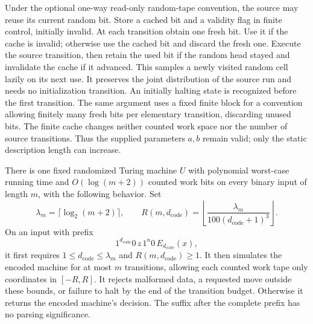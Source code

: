 Under the optional one-way read-only random-tape convention, the source
may reuse its current random bit. Store a cached bit and a validity flag
in finite control, initially invalid.
At each transition obtain one fresh bit.  Use it if the cache is invalid;
otherwise use the cached bit and discard the fresh one.  Execute the
source transition, then retain the used bit if the random head stayed
and invalidate the cache if it advanced.  This samples a newly visited
random cell lazily on its next use.  It preserves the joint distribution
of the source run and needs no initialization transition.  An initially
halting state is recognized before the first transition.  The same
argument uses a fixed finite block for a convention allowing finitely
many fresh bits per elementary transition, discarding unused bits.
The finite cache changes neither counted work space nor the number of
source transitions.  Thus the supplied parameters $a,b$ remain valid;
only the static description length can increase.

\begin{lemma}
\label{lem:compiler-interpreter}
There is one fixed randomized Turing machine $U$ with polynomial
worst-case running time and $O(\log(m+2))$ counted work bits on every
binary input of length $m$, with the following behavior.
Set
\begin{equation}\label{eq:compiler-interpreter-cap}
 \lambda_m=\lceil\log_2(m+2)\rceil,
 \qquad
 R(m,d_{\mathrm{code}})
   =\left\lfloor\frac{\lambda_m}
       {100(d_{\mathrm{code}}+1)^3}\right\rfloor.
\end{equation}
On an input with prefix
\begin{equation}\label{eq:compiler-prefix}
  1^{d_{\mathrm{code}}}0\,z\,1^n0\,
  E_{d_{\mathrm{code}}}(x),
\end{equation}
it first requires $1\le d_{\mathrm{code}}\le\lambda_m$ and
$R(m,d_{\mathrm{code}})\ge1$.  It then simulates the encoded machine
for at most $m$ transitions, allowing each counted work tape only
coordinates in $[-R,R]$.  It rejects malformed data, a requested move
outside these bounds, or failure to halt by the end of the transition
budget.  Otherwise it returns the encoded machine's decision.  The
suffix after the complete prefix has no parsing significance.
\end{lemma}

